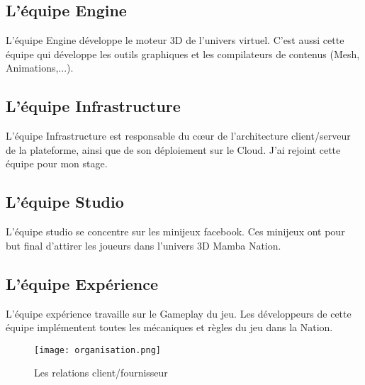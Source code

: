 \subsection{L'équipe Engine}
L'équipe Engine développe le moteur 3D de l'univers virtuel.
C'est aussi cette équipe qui développe les outils graphiques et les compilateurs
de contenus (Mesh, Animations,...).


\subsection{L'équipe Infrastructure}
L'équipe Infrastructure est responsable du cœur de l'architecture client/serveur
de la plateforme, ainsi que de son déploiement sur le Cloud.
J'ai rejoint cette équipe pour mon stage.

\subsection{L'équipe Studio}

L'équipe studio se concentre sur les minijeux facebook. Ces minijeux ont pour
but final d'attirer les joueurs dans l'univers 3D Mamba Nation.

\subsection{L'équipe Expérience}

L'équipe expérience travaille sur le Gameplay du jeu. Les développeurs de cette
équipe implémentent toutes les mécaniques et règles du jeu dans la Nation.

\begin{figure}[H]
  \begin{center}
    \texttt{[image: organisation.png]}   
  \end{center}
  \caption{Les relations client/fournisseur}
\end{figure}

